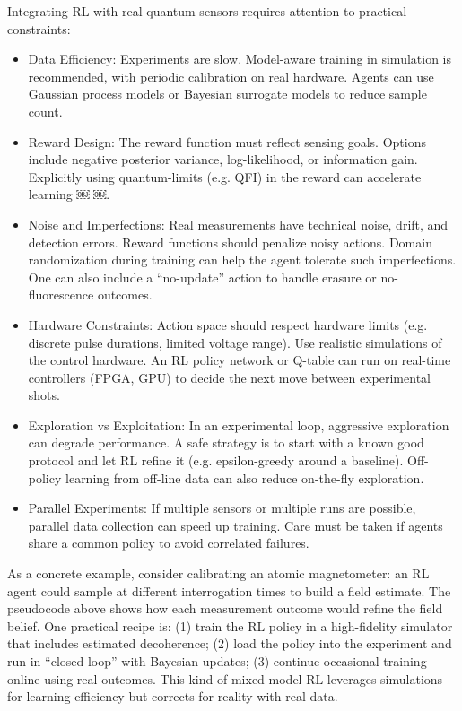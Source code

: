 \documentclass[
    aps,
    prx,
    reprint,
    superscriptaddress,
    amsmath,
    amssymb,
    longbibliography
]{revtex4-2}
\begin{document}
Integrating RL with real quantum sensors requires attention to practical constraints:
\begin{itemize}
\item    Data Efficiency: Experiments are slow. Model-aware training in simulation is recommended, with periodic calibration on real hardware. Agents can use Gaussian process models or Bayesian surrogate models to reduce sample count.
\item Reward Design: The reward function must reflect sensing goals. Options include negative posterior variance, log-likelihood, or information gain. Explicitly using quantum-limits (e.g. QFI) in the reward can accelerate learning ￼ ￼.
\item Noise and Imperfections: Real measurements have technical noise, drift, and detection errors. Reward functions should penalize noisy actions. Domain randomization during training can help the agent tolerate such imperfections. One can also include a “no-update” action to handle erasure or no-fluorescence outcomes.
\item Hardware Constraints: Action space should respect hardware limits (e.g. discrete pulse durations, limited voltage range). Use realistic simulations of the control hardware. An RL policy network or Q-table can run on real-time controllers (FPGA, GPU) to decide the next move between experimental shots.
\item Exploration vs Exploitation: In an experimental loop, aggressive exploration can degrade performance. A safe strategy is to start with a known good protocol and let RL refine it (e.g. epsilon-greedy around a baseline). Off-policy learning from off-line data can also reduce on-the-fly exploration.
\item Parallel Experiments: If multiple sensors or multiple runs are possible, parallel data collection can speed up training. Care must be taken if agents share a common policy to avoid correlated failures.
\end{itemize}

As a concrete example, consider calibrating an atomic magnetometer: an
RL agent could sample at different interrogation times to build a
field estimate. The pseudocode above shows how each measurement
outcome would refine the field belief. One practical recipe is: (1)
train the RL policy in a high-fidelity simulator that includes
estimated decoherence; (2) load the policy into the experiment and run
in “closed loop” with Bayesian updates; (3) continue occasional
training online using real outcomes. This kind of mixed-model RL
leverages simulations for learning efficiency but corrects for reality
with real data.
\end{document}
